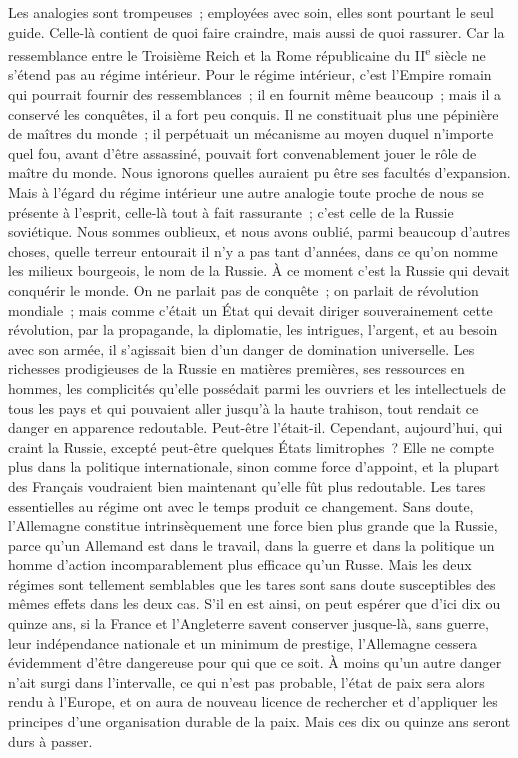 \documentclass[french,twoside]{book} %
\begin{document}
Les analogies sont trompeuses ; employées avec soin, elles sont pourtant le seul guide. Celle-là contient de quoi faire craindre, mais aussi de quoi rassurer. Car la ressemblance entre le Troisième Reich et la Rome répu­blicaine du II\textsuperscript{e} siècle ne s'étend pas au régime intérieur. Pour le régime intérieur, c'est l'Empire romain qui pourrait fournir des ressemblances ; il en fournit même beaucoup ; mais il a conservé les conquêtes, il a fort peu conquis. Il ne constituait plus une pépinière de maîtres du monde ; il perpé­tuait un mécanisme au moyen duquel n'importe quel fou, avant d'être assas­siné, pouvait fort convenablement jouer le rôle de maître du monde. Nous ignorons quelles auraient pu être ses facultés d'expansion. Mais à l'égard du régime intérieur une autre analogie toute proche de nous se présente à l'esprit, celle-là tout à fait rassurante ; c'est celle de la Russie soviétique. Nous som­mes oublieux, et nous avons oublié, parmi beaucoup d'autres choses, quelle terreur entourait il n'y a pas tant d'années, dans ce qu'on nomme les milieux bourgeois, le nom de la Russie. À ce moment c'est la Russie qui devait conquérir le monde. On ne parlait pas de conquête ; on parlait de révolution mondiale ; mais comme c'était un État qui devait diriger souverainement cette révolution, par la propagande, la diplomatie, les intrigues, l'argent, et au besoin avec son armée, il s'agissait bien d'un danger de domination universelle. Les richesses prodigieuses de la Russie en matières premières, ses ressources en hommes, les complicités qu'elle possédait parmi les ouvriers et les intellectuels de tous les pays et qui pouvaient aller jusqu'à la haute trahison, tout rendait ce danger en apparence redoutable. Peut-être l'était-il. Cependant, aujourd'hui, qui craint la Russie, excepté peut-être quelques États limitrophes ? Elle ne compte plus dans la politique internationale, sinon comme force d'appoint, et la plupart des Français voudraient bien maintenant qu'elle fût plus redoutable. Les tares essentielles au régime ont avec le temps produit ce changement. Sans doute, l'Allemagne constitue intrinsèquement une force bien plus grande que la Russie, parce qu'un Allemand est dans le travail, dans la guerre et dans la politique un homme d'action incompara­blement plus efficace qu'un Russe. Mais les deux régimes sont tellement semblables que les tares sont sans doute susceptibles des mêmes effets dans les deux cas. S'il en est ainsi, on peut espérer que d'ici dix ou quinze ans, si la France et l'Angleterre savent conserver jusque-là, sans guerre, leur indépendance nationale et un minimum de prestige, l'Allemagne cessera évidemment d'être dangereuse pour qui que ce soit. À moins qu'un autre danger n'ait surgi dans l'intervalle, ce qui n'est pas probable, l'état de paix sera alors rendu à l'Europe, et on aura de nouveau licence de rechercher et d'appliquer les principes d'une organisation durable de la paix. Mais ces dix ou quinze ans seront durs à passer.\par
\end{document}
